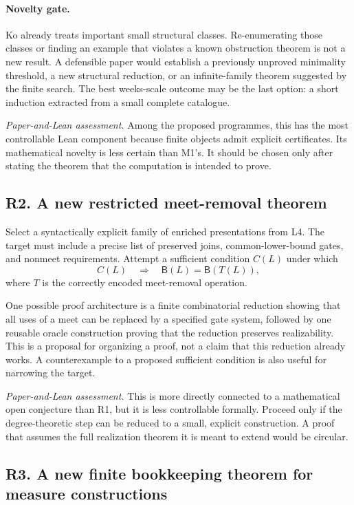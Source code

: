 \documentclass[11pt,a4paper]{article}
\newcommand{\assessment}[1]{\par\noindent\textit{Paper-and-Lean assessment.} #1\par}
\theoremstyle{definition}\newtheorem{definition}[theorem]{Definition}
\theoremstyle{remark}\newtheorem{remark}[theorem]{Remark}
\begin{document}
\paragraph{Novelty gate.}
Ko already treats important small structural classes. Re-enumerating those classes or finding an example that violates a known obstruction theorem is not a new result. A defensible paper would establish a previously unproved minimality threshold, a new structural reduction, or an infinite-family theorem suggested by the finite search. The best weeks-scale outcome may be the last option: a short induction extracted from a small complete catalogue.

\assessment{Among the proposed programmes, this has the most controllable Lean component because finite objects admit explicit certificates. Its mathematical novelty is less certain than M1's. It should be chosen only after stating the theorem that the computation is intended to prove.}

\subsection{R2. A new restricted meet-removal theorem \Pmark}
\label{entry:R2}

Select a syntactically explicit family of enriched presentations from L4. The target must include a precise list of preserved joins, common-lower-bound gates, and nonmeet requirements. Attempt a sufficient condition $C(L)$ under which
\[
 C(L)\quad\Longrightarrow\quad
       \mathsf B(L)=\mathsf B(T(L)),
\]
where $T$ is the correctly encoded meet-removal operation.

One possible proof architecture is a finite combinatorial reduction showing that all uses of a meet can be replaced by a specified gate system, followed by one reusable oracle construction proving that the reduction preserves realizability. This is a proposal for organizing a proof, not a claim that this reduction already works. A counterexample to a proposed sufficient condition is also useful for narrowing the target.

\assessment{This is more directly connected to a mathematical open conjecture than R1, but it is less controllable formally. Proceed only if the degree-theoretic step can be reduced to a small, explicit construction. A proof that assumes the full realization theorem it is meant to extend would be circular.}

\subsection{R3. A new finite bookkeeping theorem for measure constructions \Pmark}
\label{entry:R3}
\end{document}
